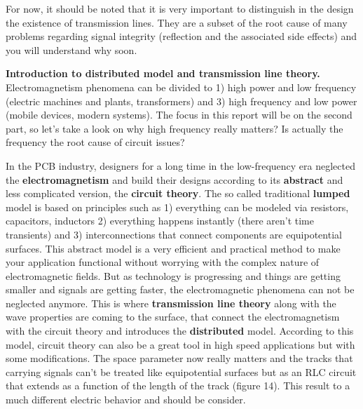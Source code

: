 \documentclass[final]{cubedoc}
\begin{document}
	
	For now, it should be noted that it is very important to distinguish in the design the existence of transmission lines. They are a subset of the root cause of many problems regarding signal integrity (reflection and the associated side effects) and you will understand why soon.
	
	\textbf{Introduction to distributed model and transmission line theory. }
	Electromagnetism phenomena can be divided to 1) high power and low frequency (electric machines and plants, transformers) and 3) high frequency and low power (mobile devices, modern systems). The focus in this report will be on the second part, so let's take a look on why high frequency really matters? Is actually the frequency the root cause of circuit issues?
	
	In the PCB industry, designers for a long time in the low-frequency era neglected the \textbf{electromagnetism} and build their designs according to its \textbf{abstract} and less complicated version, the \textbf{circuit theory}. The so called traditional \textbf{lumped} model is based on principles such as 1) everything can be modeled via resistors, capacitors, inductors 2) everything happens instantly (there aren't time transients) and 3) interconnections that connect components are equipotential surfaces. This abstract model is a very efficient and practical method to make your application functional without worrying with the complex nature of electromagnetic fields. But as technology is progressing and things are getting smaller and signals are getting faster, the electromagnetic phenomena can not be neglected anymore. This is where \textbf{transmission line theory} along with the wave properties are coming to the surface, that connect the electromagnetism with the circuit theory and introduces the \textbf{distributed} model. According to this model, circuit theory can also be a great tool in high speed applications but with some modifications. The space parameter now really matters and the tracks that carrying signals can't be treated like equipotential surfaces but as an RLC circuit that extends as a function of the length of the track (figure 14). This result to a much different electric behavior and should be consider. 
	
\end{document}
